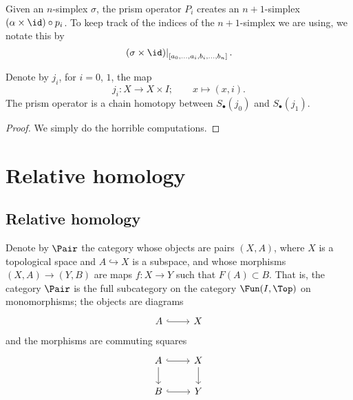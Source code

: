 \documentclass[main.tex]{subfiles}
\begin{document}
Given an \(n\)-simplex \(\sigma\), the prism operator \(P_{i}\) creates an \(n+1\)-simplex \((\alpha \times \id) \circ p_{i}\). To keep track of the indices of the \(n+1\)-simplex we are using, we notate this by
\begin{equation*}
  \left. (\sigma \times \id) \right|_{[a_{0}, \ldots, a_{i}, b_{i}, \ldots, b_{n}]}.
\end{equation*}

\begin{proposition}
  Denote by \(j_{i}\), for \(i = 0\), \(1\), the map
  \begin{equation*}
    j_{i}\colon X \to X \times I;\qquad x \mapsto (x, i).
  \end{equation*}
  The prism operator is a chain homotopy between \(S_{\bullet}(j_{0})\) and \(S_{\bullet}(j_{1})\).
\end{proposition}
\begin{proof}
  We simply do the horrible computations.
\end{proof}

\section{Relative homology}
\label{sec:relative_homology}

\subsection{Relative homology}
\label{ssc:relative_homology}

Denote by $\Pair$ the category whose objects are pairs $(X, A)$, where $X$ is a topological space and $A \hookrightarrow X$ is a subspace, and whose morphisms $(X, A) \to (Y, B)$ are maps $f\colon X \to Y$ such that $F(A) \subset B$. That is, the category \(\Pair\) is the full subcategory on the category \(\Fun(I, \Top)\) on monomorphisms; the objects are diagrams
\begin{equation*}
  \begin{tikzcd}
    A
    \arrow[r, hookrightarrow]
    & X
  \end{tikzcd}
\end{equation*}
and the morphisms are commuting squares
\begin{equation*}
  \begin{tikzcd}
    A
    \arrow[r, hookrightarrow]
    \arrow[d]
    & X
    \arrow[d]
    \\
    B
    \arrow[r, hookrightarrow]
    & Y
  \end{tikzcd}
\end{equation*}
\end{document}

